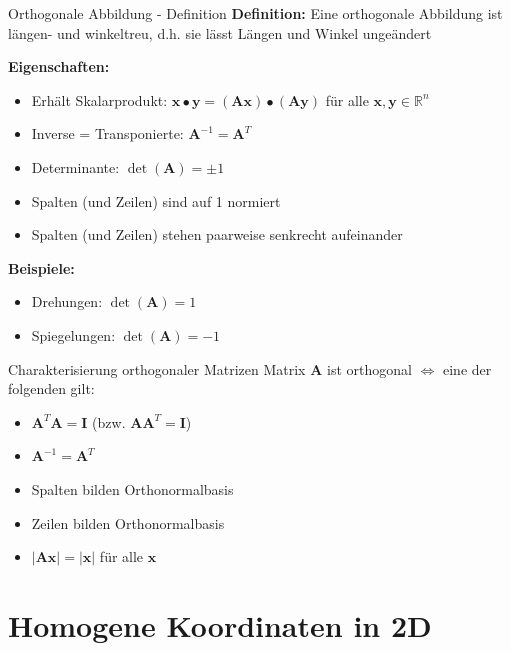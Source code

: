 \documentclass[a4paper, fontsize=7pt]{scrartcl}
\def\R{\mathbb{R}}
\begin{document}
\begin{mainbox}{Orthogonale Abbildung - Definition}
\textbf{Definition:} Eine orthogonale Abbildung ist längen- und winkeltreu, d.h. sie lässt Längen und Winkel ungeändert

\textbf{Eigenschaften:}
\begin{itemize}
    \item Erhält Skalarprodukt: $\mathbf{x} \bullet \mathbf{y} = (\mathbf{Ax}) \bullet (\mathbf{Ay})$ für alle $\mathbf{x}, \mathbf{y} \in \R^n$
    \item Inverse = Transponierte: $\mathbf{A}^{-1} = \mathbf{A}^T$
    \item Determinante: $\det(\mathbf{A}) = \pm 1$
    \item Spalten (und Zeilen) sind auf 1 normiert
    \item Spalten (und Zeilen) stehen paarweise senkrecht aufeinander
\end{itemize}

\textbf{Beispiele:}
\begin{itemize}
    \item Drehungen: $\det(\mathbf{A}) = 1$
    \item Spiegelungen: $\det(\mathbf{A}) = -1$
\end{itemize}
\end{mainbox}

\begin{subbox}{Charakterisierung orthogonaler Matrizen}
Matrix $\mathbf{A}$ ist orthogonal $\Leftrightarrow$ eine der folgenden gilt:

\begin{itemize}
    \item $\mathbf{A}^T\mathbf{A} = \mathbf{I}$ (bzw. $\mathbf{AA}^T = \mathbf{I}$)
    \item $\mathbf{A}^{-1} = \mathbf{A}^T$
    \item Spalten bilden Orthonormalbasis
    \item Zeilen bilden Orthonormalbasis
    \item $|\mathbf{Ax}| = |\mathbf{x}|$ für alle $\mathbf{x}$
\end{itemize}
\end{subbox}

\section{Homogene Koordinaten in 2D}
\end{document}
